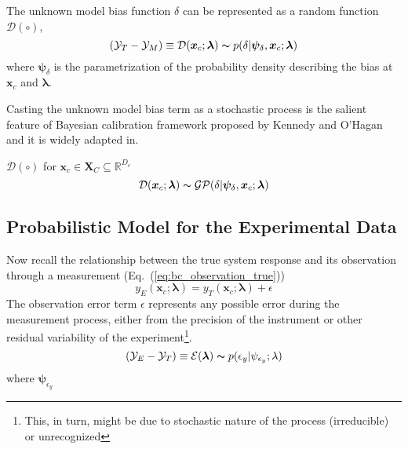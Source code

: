 The unknown model bias function $\delta$ can be represented as a random function $\mathcal{D} (\circ)$,
\begin{equation}
        (\mathcal{Y}_T - \mathcal{Y}_M) \equiv \mathcal{D}(\bm{x}_c; \bm{\lambda}) \thicksim p(\delta | \bm{\psi}_{\delta}, \bm{x}_c; \bm{\lambda})
\label{eq:bc_data_generating_bias}
\end{equation}
where $\bm{\psi}_{\delta}$ is the parametrization of the probability density describing the bias at $\bm{x}_c$ and $\bm{\lambda}$.

Casting the unknown model bias term as a stochastic process is the salient feature of Bayesian calibration framework proposed by Kennedy and O'Hagan \cite{Kennedy2001} and it is widely adapted in.

$\mathcal{D} (\circ)$ for $\bm{x}_c \in \mathbf{X}_C \subseteq \mathbb{R}^{D_c}$
\begin{equation}
        \mathcal{D}(\bm{x}_c; \bm{\lambda}) \thicksim \mathcal{GP}(\delta | \bm{\psi}_{\delta}, \bm{x}_c; \bm{\lambda})
\label{eq:bc_data_generating_bias_gp}
\end{equation}


\subsection{Probabilistic Model for the Experimental Data}\label{sub:bc_modular_data}

Now recall the relationship between the true system response and its observation through a measurement (Eq.~(\ref{eq:bc_observation_true}))
\begin{equation*}
    y_E(\bm{x}_c; \boldsymbol{\lambda}) = y_T (\bm{x}_c; \boldsymbol{\lambda}) + \epsilon
\end{equation*}
The observation error term $\epsilon$ represents any possible error during the measurement process, either from the precision of the instrument or other residual variability of the experiment\footnote{This, in turn, might be due to stochastic nature of the process (irreducible) or unrecognized}.
\begin{equation}
        (\mathcal{Y}_E - \mathcal{Y}_T) \equiv \mathcal{E}(\bm{\lambda}) \thicksim p(\epsilon_y | \psi_{\epsilon_y}; \lambda)
\label{eq:bc_data_generating_exp}
\end{equation}
where $\bm{\psi}_{\epsilon_y}$
 
